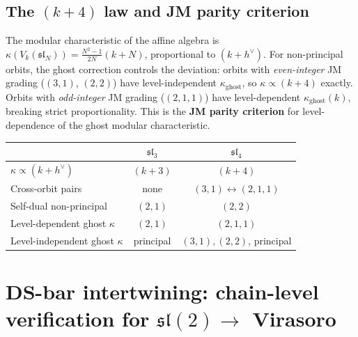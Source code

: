 \documentclass[11pt]{article}
\newcommand{\fsl}{\mathfrak{sl}}
\begin{document}
\subsection{The $(k+4)$ law and JM parity criterion}
\label{subsec:sl4-kN-law-wn}

\begin{observation}
\label{obs:sl4-kN-law-wn}
The modular characteristic of the affine algebra is
$\kappa(V_k(\fsl_N)) = \frac{N^2-1}{2N}(k+N)$, proportional to $(k+h^\vee)$.
For non-principal orbits, the ghost correction controls the deviation:
orbits with \emph{even-integer} JM grading ($(3,1)$, $(2,2)$) have
level-independent $\kappa_{\mathrm{ghost}}$, so $\kappa \propto (k+4)$
exactly.  Orbits with \emph{odd-integer} JM grading ($(2,1,1)$) have
level-dependent $\kappa_{\mathrm{ghost}}(k)$, breaking strict
proportionality.  This is the \textbf{JM parity criterion} for
level-dependence of the ghost modular characteristic.
\end{observation}

\begin{observation}[Comparison with $\fsl_3$]
\label{obs:sl4-vs-sl3-wn}
\begin{center}
\renewcommand{\arraystretch}{1.2}
\begin{tabular}{lcc}
& $\fsl_3$ & $\fsl_4$ \\
\hline
$\kappa \propto (k+h^\vee)$ & $(k+3)$ & $(k+4)$ \\[2pt]
Cross-orbit pairs & none & $(3,1) \leftrightarrow (2,1,1)$ \\[2pt]
Self-dual non-principal & $(2,1)$ & $(2,2)$ \\[2pt]
Level-dependent ghost $\kappa$ & $(2,1)$ & $(2,1,1)$ \\[2pt]
Level-independent ghost $\kappa$ & principal & $(3,1), (2,2)$, principal \\[2pt]
\end{tabular}
\end{center}
\end{observation}


%
%

\section{DS-bar intertwining: chain-level verification for
$\fsl(2) \to$ Virasoro}
\label{sec:ds-bar-chain-level}
\end{document}
